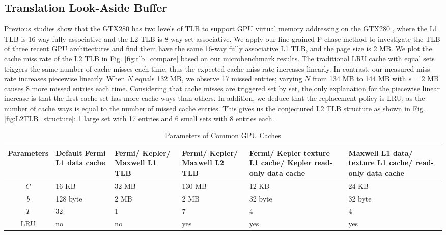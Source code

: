 \documentclass[10pt,journal,compsoc]{IEEEtran}
\theoremstyle{definition}
\begin{document}
\subsection{Translation Look-Aside Buffer}


Previous studies show that the GTX280 has two levels of TLB to support GPU virtual memory addressing on the GTX280 \cite{papadopoulou2009micro,wong2010demystifying}, where the L1 TLB is 16-way fully associative and the L2 TLB is 8-way set-associative. We apply our fine-grained P-chase method to investigate the TLB of three recent GPU architectures and find them have the same 16-way fully associative L1 TLB, and the page size is 2 MB. We plot the cache miss rate of the L2 TLB in Fig. \ref{fig:tlb_compare} based on our microbenchmark results. The traditional LRU cache with equal sets triggers the same number of cache misses each time, thus the expected cache miss rate increases linearly. In contrast, our measured miss rate increases piecewise linearly. When $N$ equals 132 MB, we observe 17 missed entries; varying $N$ from 134 MB to 144 MB with $s=2$ MB causes 8 more missed entries each time. Considering that cache misses are triggered set by set, the only explanation for the piecewise linear increase is that the first cache set has more cache ways than others. In addition, we deduce that the replacement policy is LRU, as the number of cache ways is equal to the number of missed cache entries. This gives us the conjectured L2 TLB structure as shown in Fig. \ref{fig:L2TLB_structure}: 1 large set with 17 entries and 6 small sets with 8 entries each.

\begin{table*}\renewcommand{\arraystretch}{1.1}
\centering
\caption{Parameters of Common GPU Caches}
\begin{tabular}{|c|m{0.8in}<{\centering}|m{0.8in}<{\centering}|m{0.8in}<{\centering}|m{1.1 in}<{\centering}|m{1.1 in}<{\centering}|}
    \hline
    Parameters & Default Fermi L1 data cache & Fermi/ Kepler/ Maxwell L1 TLB & Fermi/ Kepler/ Maxwell L2 TLB & Fermi/ Kepler texture L1 cache/ Kepler read-only data cache& Maxwell L1 data/ texture L1 cache/ read-only data cache \\ \hline
    $C$ & 16 KB  & 32 MB & 130 MB & 12 KB & 24 KB\\ \hline
    $b$ & 128 byte & 2 MB & 2 MB & 32 byte & 32 byte \\ \hline
    $T$ & 32 & 1 & 7 & 4  &4 \\ \hline
    LRU & no & no & yes & yes &yes\\ \hline
\end{tabular}
\label{tab:parameters}

\end{table*}
\end{document}
